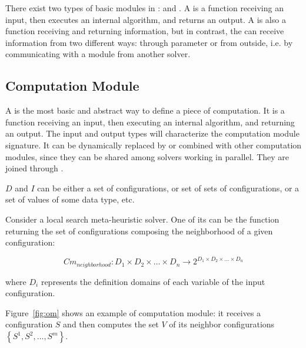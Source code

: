 There exist two types of basic modules in \posl: \oms{} and \opchs{}. A \om{} is a function receiving an input, then executes an internal algorithm, and returns an output. A \opch{} is also a function receiving and returning information, but in contrast, the \opch{} can receive information from two different ways: through parameter or from outside, i.e. by communicating with a module from another solver.

\subsection{Computation Module}


A \om{} is the most basic and abstract way to define a piece of computation. It is a function receiving an input, then executing an internal algorithm, and returning an output. The input and output types will characterize the computation module signature. It can be dy\-na\-mi\-cally replaced by or combined with other computation modules, since they can be shared among solvers working in parallel. They are joined through \ass.


$D$ and $I$ can be either a set of configurations, or set of sets of configurations, or a set of values of some data type, etc.

Consider a local search meta-heuristic solver. One of its \oms{} can be the function returning the set of configurations composing the neighborhood of a given configuration:

\begin{equation*}
Cm_{neighborhood}:D_1\times D_2\times\dots\times D_n \rightarrow 2^{D_1\times D_2\times\dots\times D_n}
\end{equation*}

\noindent where $D_i$ represents the definition domains of each variable of the input confi\-gura\-tion.

Figure~\ref{fig:om} shows an example of computation module: it receives a configuration $S$ and then computes the set $V$ of its neighbor configurations $\left\{S^1, S^2, \dots, S^m\right\}$.

